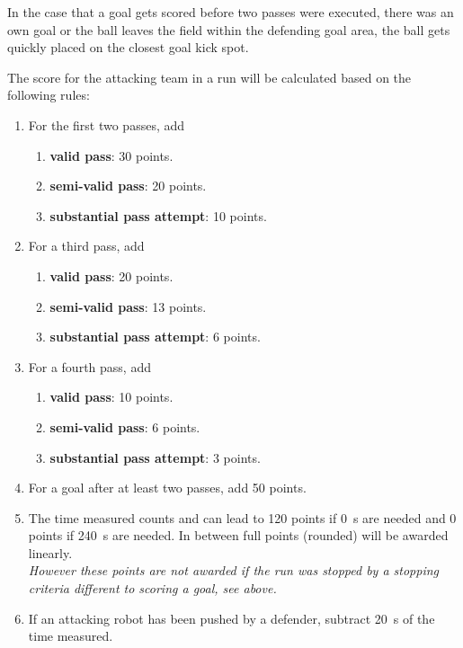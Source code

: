 In the case that a goal gets scored before two passes were executed, there was an own goal or the ball leaves the field within the defending goal area, the ball gets quickly placed on the closest goal kick spot.

The score for the attacking team in a run will be calculated based on the following rules:

\begin{enumerate}
	\item For the first two passes, add 
	\begin{enumerate}
		\item \textbf{valid pass}: \qty{30}{} points.
		\item \textbf{semi-valid pass}: \qty{20}{} points.
		\item \textbf{substantial pass attempt}: \qty{10}{} points.
	\end{enumerate}
	\item For a third pass, add
	\begin{enumerate}
		\item \textbf{valid pass}: \qty{20}{} points.
		\item \textbf{semi-valid pass}: \qty{13}{} points.
		\item \textbf{substantial pass attempt}: \qty{6}{} points.
	\end{enumerate}
	\item For a fourth pass, add
	\begin{enumerate}
		\item \textbf{valid pass}: \qty{10}{} points.
		\item \textbf{semi-valid pass}: \qty{6}{} points.
		\item \textbf{substantial pass attempt}: \qty{3}{} points.
	\end{enumerate}
	\item For a goal after at least two passes, add \qty{50}{} points.
	\item The time measured counts and can lead to \qty{120}{} points if \qty{0}{\second} are needed and \qty{0}{} points if \qty{240}{\second} are needed. In between full points (rounded) will be awarded linearly. \\
	\textit{However these points are not awarded if the run was stopped by a stopping criteria different to scoring a goal, see above.}
	\item If an attacking robot has been pushed by a defender, subtract \qty{20}{\second} of the time measured.
\end{enumerate}

